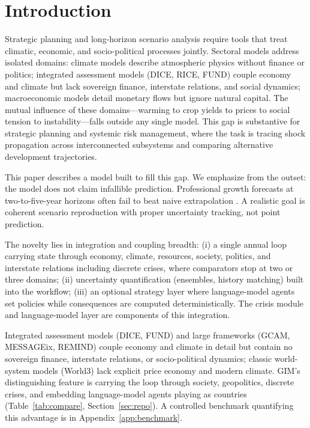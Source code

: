 \documentclass[a4paper,fleqn]{cas-sc}
\begin{document}
\section{Introduction}

Strategic planning and long-horizon scenario analysis require tools that treat climatic, economic, and socio-political processes jointly. Sectoral models address isolated domains: climate models describe atmospheric physics without finance or politics; integrated assessment models (DICE, RICE, FUND) couple economy and climate but lack sovereign finance, interstate relations, and social dynamics; macroeconomic models detail monetary flows but ignore natural capital. The mutual influence of these domains---warming to crop yields to prices to social tension to instability---falls outside any single model. This gap is substantive for strategic planning and systemic risk management, where the task is tracing shock propagation across interconnected subsystems and comparing alternative development trajectories.

This paper describes a model built to fill this gap. We emphasize from the outset: the model does not claim infallible prediction. Professional growth forecasts at two-to-five-year horizons often fail to beat naive extrapolation \citep{celasun2021}. A realistic goal is coherent scenario reproduction with proper uncertainty tracking, not point prediction.

The novelty lies in integration and coupling breadth: (i) a single annual loop carrying state through economy, climate, resources, society, politics, and interstate relations including discrete crises, where comparators stop at two or three domains; (ii) uncertainty quantification (ensembles, history matching) built into the workflow; (iii) an optional strategy layer where language-model agents set policies while consequences are computed deterministically. The crisis module and language-model layer are components of this integration.

Integrated assessment models (DICE, FUND) and large frameworks (GCAM, MESSAGEix, REMIND) couple economy and climate in detail but contain no sovereign finance, interstate relations, or socio-political dynamics; classic world-system models (World3) lack explicit price economy and modern climate. GIM's distinguishing feature is carrying the loop through society, geopolitics, discrete crises, and embedding language-model agents playing as countries (Table~\ref{tab:compare}, Section~\ref{sec:repo}). A controlled benchmark quantifying this advantage is in Appendix~\ref{app:benchmark}.
\end{document}

